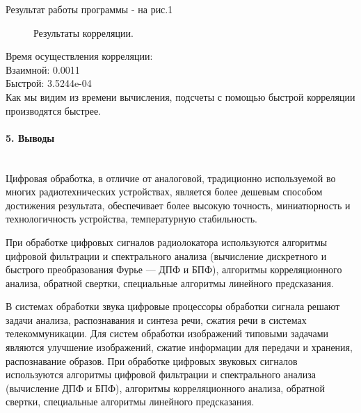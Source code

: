 \documentclass[12pt,a4paper]{report}
\begin{document}
Результат работы программы - на рис.1\\
\begin{figure}[h!]
\caption{Результаты корреляции.}
\end{figure}

Время осуществления корреляции:\\ 
Взаимной: 0.0011\\
Быстрой: 3.5244e-04\\

Как мы видим из времени вычисления, подсчеты с помощью быстрой корреляции производятся быстрее.
\newpage
\paragraph{5. Выводы\\\\}
Цифровая обработка, в отличие от аналоговой, традиционно используемой во многих радиотехнических устройствах, является более дешевым способом достижения результата, обеспечивает более высокую точность, миниатюрность и технологичность устройства, температурную стабильность.

При обработке цифровых сигналов радиолокатора используются алгоритмы цифровой фильтрации и спектрального анализа (вычисление дискретного и быстрого преобразования Фурье — ДПФ и БПФ), алгоритмы корреляционного анализа, обратной свертки, специальные алгоритмы линейного предсказания.

В системах обработки звука цифровые процессоры обработки сигнала решают задачи анализа, распознавания и синтеза речи, сжатия речи в системах телекоммуникации. Для систем обработки изображений типовыми задачами являются улучшение изображений, сжатие информации для передачи и хранения, распознавание образов. При обработке цифровых звуковых сигналов используются алгоритмы цифровой фильтрации и спектрального анализа (вычисление ДПФ и БПФ), алгоритмы корреляционного анализа, обратной свертки, специальные алгоритмы линейного предсказания.
\end{document}
